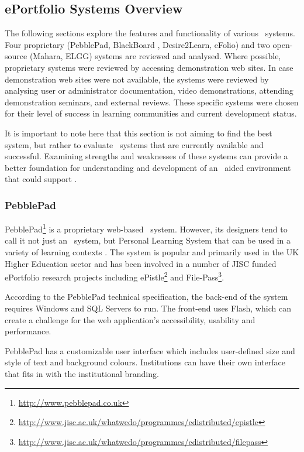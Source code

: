 \subsection{ePortfolio Systems Overview}
The following sections explore the features and functionality of various
\ep~systems. Four proprietary (PebblePad, BlackBoard \ep, Desire2Learn, eFolio)
and two open-source (Mahara, ELGG) systems are reviewed and analysed. Where
possible, proprietary systems were reviewed by accessing demonstration web
sites. In case demonstration web sites were not available, the systems were
reviewed by analysing user or administrator documentation, video demonstrations,
attending demonstration seminars, and external reviews. These specific systems
were chosen for their level of success in learning communities and current
development status.

It is important to note here that this section is not aiming to find the best
system, but rather to evaluate \ep~systems that are currently available and
successful. Examining strengths and weaknesses of these systems can provide a
better foundation for understanding and development of an \ep~aided environment
that could support \LLLsn.

\subsubsection{PebblePad}

PebblePad\footnote{\url{http://www.pebblepad.co.uk}} is a proprietary web-based
\ep~system. However, its designers tend to call it not just an \ep~system, but
Personal Learning System that can be used in a variety of learning contexts
\citep{PebbleLearningLtd2010}. The system is popular and primarily used in the
UK Higher Education sector and has been involved in a number of JISC funded
ePortfolio research projects including
ePistle\footnote{\url{http://www.jisc.ac.uk/whatwedo/programmes/edistributed/epistle}}
and File-Pass\footnote{\url{http://www.jisc.ac.uk/whatwedo/programmes/edistributed/filepass}}.

According to the PebblePad technical specification, the back-end of the system
requires Windows and SQL Servers to run. The front-end uses Flash, which can
create a challenge for the web application's accessibility, usability and
performance.

PebblePad has a customizable user interface which includes user-defined size and
style of text and background colours. Institutions can have their own interface
that fits in with the institutional branding.

